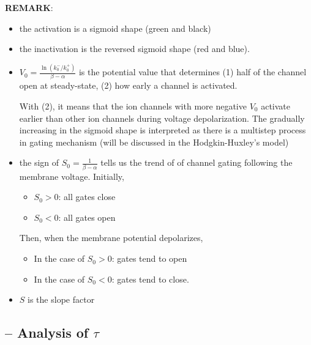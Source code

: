 {\bf REMARK}:
\begin{itemize}
\item the activation is a sigmoid shape (green and black)

\item the inactivation is the reversed sigmoid shape (red and blue).

\item $V_0= \frac{\ln (k_0^-/k_0^+)}{\beta-\alpha}$ is the potential
  value that determines (1) half of the channel open at steady-state,
  (2) how early a channel is activated.

  With (2), it means that the ion channels with more negative $V_0$
  activate earlier than other ion channels during voltage
  depolarization. The gradually increasing in the sigmoid shape is
  interpreted as there is a multistep process in gating mechanism
  (will be discussed in the Hodgkin-Huxley's model)

\item the sign of $S_0 = \frac{1}{\beta-\alpha}$ tells us the trend of
  of channel gating following the membrane voltage. Initially,
  \begin{itemize}
  \item $S_0>0$: all gates close
  \item $S_0<0$: all gates open
  \end{itemize}
  Then, when the membrane potential depolarizes,
  \begin{itemize}
  \item In the case of $S_0>0$: gates tend to open
  \item In the case of $S_0<0$: gates tend to close.
  \end{itemize}
\item $S$ is the slope factor
\end{itemize}


\subsection{-- Analysis of $\tau$}
\label{sec:analysis}

